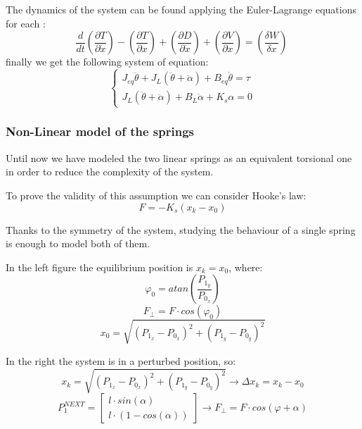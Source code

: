             The dynamics of the system can be found applying the Euler-Lagrange equations for each \dof:
            \begin{equation*}
                \frac{d}{dt} \left(\frac{\partial T}{\partial \dot{x}}\right)-\left(\frac{\partial T}{\partial x}\right)+\left(\frac{\partial D}{\partial \dot{x}}\right)+\left(\frac{\partial V}{\partial x}\right) = \left(\frac{\delta W}{\delta x}\right)\
            \end{equation*}
            finally we get the following system of equation:
            \begin{equation*}
                \begin{cases*}
                    J_{eq}\ddot\theta+J_{L}(\ddot\theta+\ddot\alpha) + B_{eq}\dot\theta=\tau \\
                    J_{L}(\ddot\theta+\ddot\alpha)+B_L\dot\alpha +K_s\alpha=0
                \end{cases*}
            \end{equation*}

            \subsubsection{Non-Linear model of the springs}

                Until now we have modeled the two linear springs as an equivalent torsional one in order to reduce the complexity of the system.

                To prove the validity of this assumption we can consider Hooke's law:
                    \[
                        F = - K_s (x_k - x_0)
                    \]

                Thanks to the symmetry of the system, studying the behaviour of a single spring is enough to model both of them.


                In the left figure the equilibrium position is $x_k = x_0$, where:
                \[
                    \varphi_0 = atan\left(\frac{P_{1_y}}{P_{0_x}}\right)\]
                \[
                    F_\perp = F \cdot cos(\varphi_0)\]
                \[
                    x_0 = \sqrt{(P_{1_x} - P_{0_x})^2+(P_{1_y} - P_{0_y})^2}\]

                In the right the system is in a perturbed position, so:
                \[
                    x_k = \sqrt{(P_{1_x} - P_{0_x})^2+(P_{1_y} - P_{0_y})^2} \rightarrow \Delta x_k = x_k - x_0\]
                \[
                    P_1^{NEXT} = \left\lbrack \begin{array}{c}
                        l \cdot sin(\alpha) \\
                        l \cdot (1-cos(\alpha))
                        \end{array}\right\rbrack
                        \rightarrow F_\perp  = F \cdot cos(\varphi + \alpha)\]

